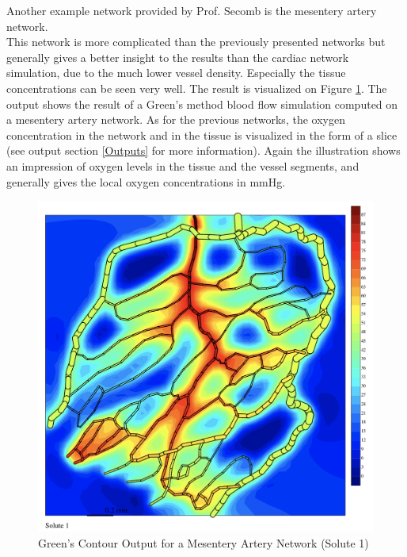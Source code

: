 Another example network provided by Prof. Secomb is the mesentery artery network.
\\This network is more complicated than the previously presented networks but generally gives a better insight to the results than the cardiac network simulation, due to the much lower vessel density. Especially the tissue concentrations can be seen very well. The result is visualized on Figure \ref{fig:Contour_Mesent1}. The output shows the result of a Green's method blood flow simulation computed on a mesentery artery network. As for the previous networks, the oxygen concentration in the network and in the tissue is visualized in the form of a slice (see output section \ref{Outputs} for more information). Again the illustration shows an impression of oxygen levels in the tissue and the vessel segments, and generally gives the local oxygen concentrations in mmHg.
\begin{figure}[h]
\centering
\includegraphics[width=120mm]{Contour_Mesent1}
\caption{\footnotesize Green's Contour Output for a Mesentery Artery Network (Solute 1)}
\label{fig:Contour_Mesent1}
\end{figure}
%
